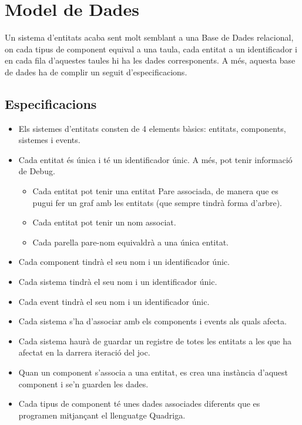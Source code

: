 \section{Model de Dades}

  Un sistema d'entitats acaba sent molt semblant a una Base de Dades relacional, on cada tipus de component equival a una taula, cada entitat a un identificador i en cada fila d'aquestes taules hi ha les dades corresponents. A més, aquesta base de dades ha de complir un seguit d'especificacions.
  
  \subsection{Especificacions}
  \label{subsec:Especificacions}
  
  \begin{itemize}
    \item Els sistemes d'entitats consten de 4 elements bàsics: entitats, components, sistemes i events.
    
    \item Cada entitat és única i té un identificador únic. A més, pot tenir informació de Debug.
      \begin{itemize}
        \item Cada entitat pot tenir una entitat Pare associada, de manera que es pugui fer un graf amb les entitats (que sempre tindrà forma d'arbre).
        \item Cada entitat pot tenir un nom associat.
        \item Cada parella pare-nom equivaldrà a una única entitat.
      \end{itemize}
    \item Cada component tindrà el seu nom i un identificador únic.
    
    \item Cada sistema tindrà el seu nom i un identificador únic.
    
    \item Cada event tindrà el seu nom i un identificador únic.
    
    \item Cada sistema s'ha d'associar amb els components i events als quals afecta.
    
    \item Cada sistema haurà de guardar un registre de totes les entitats a les que ha afectat en la darrera iteració del joc.
    
    \item Quan un component s'associa a una entitat, es crea una instància d'aquest component i se'n guarden les dades.
    
    \item Cada tipus de component té unes dades associades diferents que es programen mitjançant el llenguatge Quadriga.
  \end{itemize}
  
